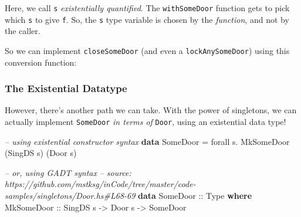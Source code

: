 \documentclass[]{article}
\newenvironment{Shaded}{}{}
\newcommand{\KeywordTok}[1]{\textcolor[rgb]{0.00,0.44,0.13}{\textbf{#1}}}
\newcommand{\DataTypeTok}[1]{\textcolor[rgb]{0.56,0.13,0.00}{#1}}
\newcommand{\CommentTok}[1]{\textcolor[rgb]{0.38,0.63,0.69}{\textit{#1}}}
\newcommand{\OtherTok}[1]{\textcolor[rgb]{0.00,0.44,0.13}{#1}}
\newcommand{\FunctionTok}[1]{\textcolor[rgb]{0.02,0.16,0.49}{#1}}
\newcommand{\NormalTok}[1]{#1}
\begin{document}
Here, we call \texttt{s} \emph{existentially quantified}. The
\texttt{withSomeDoor} function gets to pick which \texttt{s} to give \texttt{f}.
So, the \texttt{s} type variable is chosen by the \emph{function}, and not by
the caller.

So we can implement \texttt{closeSomeDoor} (and even a \texttt{lockAnySomeDoor})
using this conversion function:

\begin{Shaded}
\end{Shaded}

\subsubsection{The Existential Datatype}\label{the-existential-datatype}

However, there's another path we can take. With the power of singletons, we can
actually implement \texttt{SomeDoor} \emph{in terms of} \texttt{Door}, using an
existential data type!

\begin{Shaded}
\begin{Highlighting}[]
\CommentTok{-- using existential constructor syntax}
\KeywordTok{data} \DataTypeTok{SomeDoor} \FunctionTok{=}\NormalTok{ forall s}\FunctionTok{.} \DataTypeTok{MkSomeDoor}\NormalTok{ (}\DataTypeTok{SingDS}\NormalTok{ s) (}\DataTypeTok{Door}\NormalTok{ s)}

\CommentTok{-- or, using GADT syntax}
\CommentTok{-- source: https://github.com/mstksg/inCode/tree/master/code-samples/singletons/Door.hs#L68-69}
\KeywordTok{data} \DataTypeTok{SomeDoor}\OtherTok{ ::} \DataTypeTok{Type} \KeywordTok{where}
    \DataTypeTok{MkSomeDoor}\OtherTok{ ::} \DataTypeTok{SingDS}\NormalTok{ s }\OtherTok{->} \DataTypeTok{Door}\NormalTok{ s }\OtherTok{->} \DataTypeTok{SomeDoor}
\end{Highlighting}
\end{Shaded}
\end{document}
